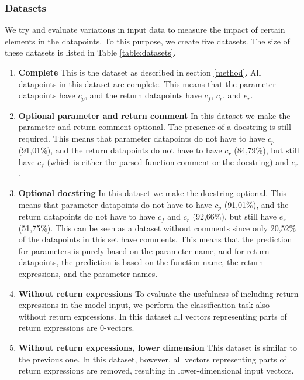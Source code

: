 \subsubsection{Datasets}

We try and evaluate variations in input data to measure the impact of certain elements in the datapoints. To this purpose, we create five datasets. The size of these datasets is listed in Table \ref{table:datasets}.


\begin{enumerate}
    \item \textbf{Complete} This is the dataset as described in section \ref{method}. All datapoints in this dataset are complete. This means that the parameter datapoints have $c_p$, and the return datapoints have $c_f$, $c_r$, and $e_r$. 
    
    \item \textbf{Optional parameter and return comment} In this dataset we make the parameter and return comment optional. The presence of a docstring is still required. This means that parameter datapoints do not have to have $c_p$ (91,01\%), and the return datapoints do not have to have $c_r$ (84,79\%), but still have $c_f$ (which is either the parsed function comment or the docstring) and $e_r$.
    
    \item \textbf{Optional docstring} In this dataset we make the docstring optional. This means that parameter datapoints do not have to have $c_p$ (91,01\%), and the return datapoints do not have to have $c_f$ and $c_r$ (92,66\%), but still have $e_r$ (51,75\%). This can be seen as a dataset without comments since only 20,52\% of the datapoints in this set have comments. This means that the prediction for parameters is purely based on the parameter name, and for return datapoints, the prediction is based on the function name, the return expressions, and the parameter names.
    
    \item \textbf{Without return expressions} To evaluate the usefulness of including return expressions in the model input, we perform the classification task also without return expressions. In this dataset all vectors representing parts of return expressions are 0-vectors.
    
    \item \textbf{Without return expressions, lower dimension} This dataset is similar to the previous one. In this dataset, however, all vectors representing parts of return expressions are removed, resulting in lower-dimensional input vectors.
\end{enumerate}
